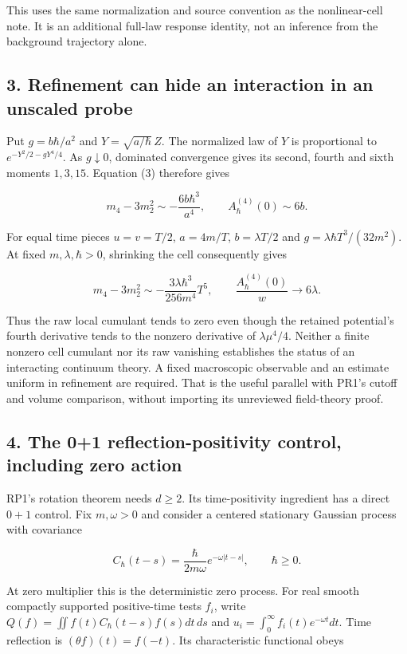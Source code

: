 \documentclass[11pt,a4paper]{article}
\begin{document}
This uses the same normalization and source convention as the
nonlinear-cell note. It is an additional full-law response identity, not
an inference from the background trajectory alone.

\subsection{3. Refinement can hide an interaction in an unscaled
probe}\label{refinement-can-hide-an-interaction-in-an-unscaled-probe}

Put \(g=b\hbar/a^2\) and \(Y=\sqrt{a/\hbar}\,Z\). The normalized law of
\(Y\) is proportional to \(e^{-Y^2/2-gY^4/4}\). As \(g\downarrow0\),
dominated convergence gives its second, fourth and sixth moments
\(1,3,15\). Equation (3) therefore gives

\[
 m_4-3m_2^2\sim-\frac{6b\hbar^3}{a^4},\qquad
 A_\hbar^{(4)}(0)\sim6b.
 \tag{6}
\]

For equal time pieces \(u=v=T/2\), \(a=4m/T\), \(b=\lambda T/2\) and
\(g=\lambda\hbar T^3/(32m^2)\). At fixed \(m,\lambda,\hbar>0\),
shrinking the cell consequently gives

\[
 m_4-3m_2^2\sim-\frac{3\lambda\hbar^3}{256m^4}T^5,
 \qquad \frac{A_\hbar^{(4)}(0)}w\longrightarrow6\lambda.
 \tag{7}
\]

Thus the raw local cumulant tends to zero even though the retained
potential's fourth derivative tends to the nonzero derivative of
\(\lambda\mu^4/4\). Neither a finite nonzero cell cumulant nor its raw
vanishing establishes the status of an interacting continuum theory. A
fixed macroscopic observable and an estimate uniform in refinement are
required. That is the useful parallel with PR1's cutoff and volume
comparison, without importing its unreviewed field-theory proof.

\subsection{4. The 0+1 reflection-positivity control, including zero
action}\label{the-01-reflection-positivity-control-including-zero-action}

RP1's rotation theorem needs \(d\ge2\). Its time-positivity ingredient
has a direct \(0+1\) control. Fix \(m,\omega>0\) and consider a centered
stationary Gaussian process with covariance

\[
 C_\hbar(t-s)=\frac{\hbar}{2m\omega}e^{-\omega|t-s|},
 \qquad \hbar\ge0.
 \tag{8}
\]

At zero multiplier this is the deterministic zero process. For real
smooth compactly supported positive-time tests \(f_i\), write
\(Q(f)=\iint f(t)C_\hbar(t-s)f(s)dt\,ds\) and
\(u_i=\int_0^\infty f_i(t)e^{-\omega t}dt\). Time reflection is
\((\theta f)(t)=f(-t)\). Its characteristic functional obeys
\end{document}
